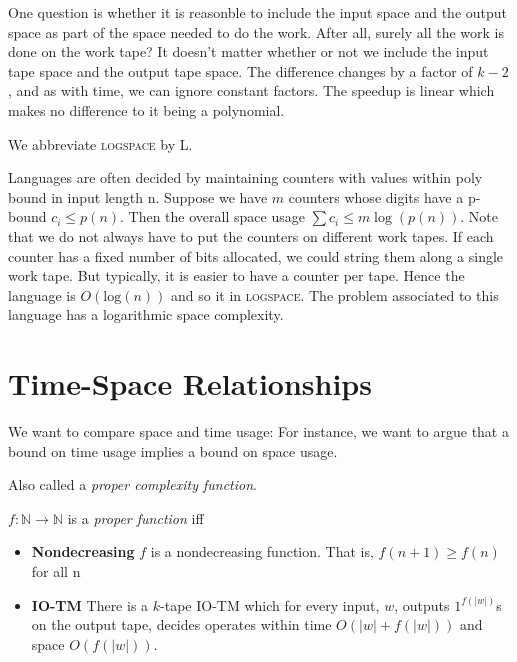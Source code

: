 One question is whether it is reasonble to include the 
input space and the output space as part of the space needed 
to do the work. After all, surely all the work is done on the 
work tape? It doesn't matter whether or not we include 
the input tape space and the output tape space. 
The difference changes by a factor of $k-2$, 
and as with time, we can ignore constant factors. 
The speedup is linear which makes no difference to it 
being a polynomial. 



We abbreviate \textsc{logspace} by L.

\frmrule

\begin{example}

Languages are often decided by maintaining counters with values within
poly bound in input length n.
Suppose we have $m$ counters whose digits have a 
p-bound $c_i \leqslant p(n)$.
Then the overall space usage $\sum c_i \leqslant m\log(p(n))$. 
Note that we do not always have to put the counters on different work tapes. 
If each counter has a fixed number of bits allocated, we could string them along a single work 
tape. But typically, it is easier to have a counter per tape.
Hence the language is $O(\text{log}(n))$ and so it in \textsc{logspace}. 
The problem associated to this language has a 
logarithmic space complexity.

\end{example}




\section{Time-Space Relationships}


We want to compare space and time usage:
For instance, we want to argue that a bound on time usage implies a
bound on space usage. 

Also called a \textit{proper complexity function}. 

$f:\mathbb{N} \rightarrow \mathbb{N}$ is a \textit{proper function} iff

\begin{itemize}   
\renewcommand{\labelitemi}{$\Box$}
\item \textbf{Nondecreasing} 
$f$ is a nondecreasing function. That is, $f(n+1) \geqslant f(n)$ for all n
\item \textbf{IO-TM} 
There is a $k$-tape IO-TM which for every input, $w$, 
outputs $1^{f(|w|)}$s on the output tape, decides operates within time $O(|w| + f(|w|))$ 
and space $O(f(|w|))$. 
\end{itemize} 


